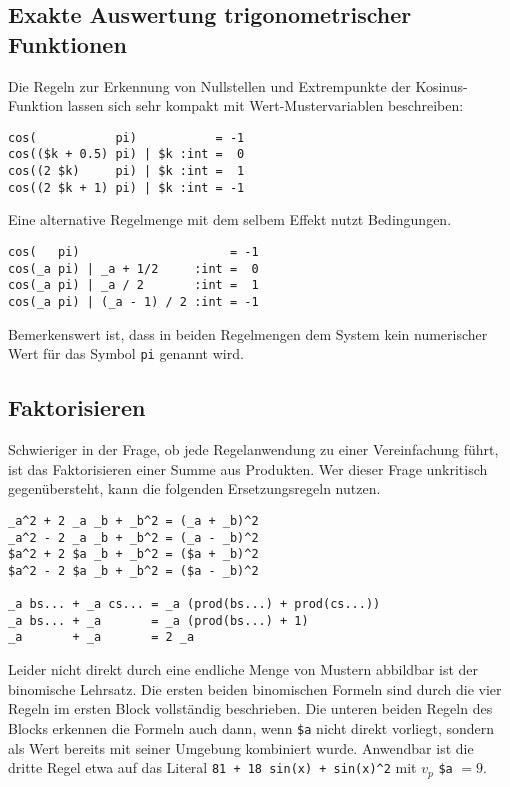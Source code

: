 \subsection{Exakte Auswertung trigonometrischer Funktionen} \label{subsubsecCos}
Die Regeln zur Erkennung von Nullstellen und Extrempunkte der Kosinus-Funktion lassen sich sehr kompakt mit Wert-Mustervariablen beschreiben: 

\begin{unbreakable}\begin{verbatim}
cos(           pi)           = -1
cos(($k + 0.5) pi) | $k :int =  0
cos((2 $k)     pi) | $k :int =  1
cos((2 $k + 1) pi) | $k :int = -1
\end{verbatim}\end{unbreakable}

Eine alternative Regelmenge mit dem selbem Effekt nutzt Bedingungen.

\begin{unbreakable}\begin{verbatim}
cos(   pi)                     = -1
cos(_a pi) | _a + 1/2     :int =  0
cos(_a pi) | _a / 2       :int =  1
cos(_a pi) | (_a - 1) / 2 :int = -1
\end{verbatim}\end{unbreakable}

Bemerkenswert ist, dass in beiden Regelmengen dem System kein numerischer Wert für das Symbol \verb|pi| genannt wird.

\subsection{Faktorisieren}
Schwieriger in der Frage, ob jede Regelanwendung zu einer Vereinfachung führt, ist das Faktorisieren einer Summe aus Produkten. Wer dieser Frage unkritisch gegenübersteht, kann die folgenden Ersetzungsregeln nutzen.

\begin{unbreakable}\begin{verbatim}
_a^2 + 2 _a _b + _b^2 = (_a + _b)^2
_a^2 - 2 _a _b + _b^2 = (_a - _b)^2
$a^2 + 2 $a _b + _b^2 = ($a + _b)^2
$a^2 - 2 $a _b + _b^2 = ($a - _b)^2

_a bs... + _a cs... = _a (prod(bs...) + prod(cs...))
_a bs... + _a       = _a (prod(bs...) + 1)
_a       + _a       = 2 _a
\end{verbatim}\end{unbreakable}

Leider nicht direkt durch eine endliche Menge von Mustern abbildbar ist der binomische Lehrsatz. Die ersten beiden binomischen Formeln sind durch die vier Regeln im ersten Block vollständig beschrieben. Die unteren beiden Regeln des Blocks erkennen die Formeln auch dann, wenn \verb|$a| nicht direkt vorliegt, sondern als Wert bereits mit seiner Umgebung kombiniert wurde. Anwendbar ist die dritte Regel etwa auf das Literal \verb|81 + 18 sin(x) + sin(x)^2| mit $v_p$ \verb|$a| $= 9$.

